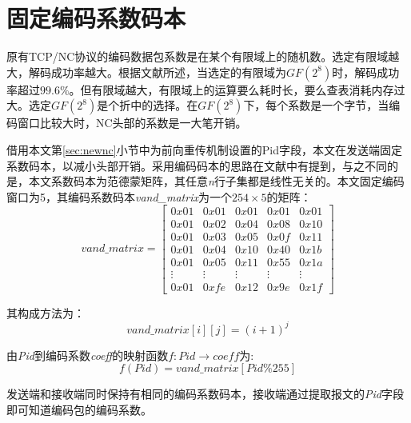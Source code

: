 \section{固定编码系数码本}
原有TCP/NC协议的编码数据包系数是在某个有限域上的随机数。选定有限域越大，解码成功率越大。根据文献\cite{4015738}所述，当选定的有限域为$GF\left(2^8\right)$时，解码成功率超过$99.6\%$。但有限域越大，有限域上的运算要么耗时长，要么查表消耗内存过大。选定$GF\left(2^8\right)$是个折中的选择。在$GF\left(2^8\right)$下，每个系数是一个字节，当编码窗口比较大时，NC头部的系数是一大笔开销。
\par
借用本文第\ref{sec:newnc}小节中为前向重传机制设置的Pid字段，本文在发送端固定系数码本，以减小头部开销。采用编码码本的思路在文献\cite{宋蒙2015基于网络编码的}中有提到，与之不同的是，本文系数码本为范德蒙矩阵，其任意\emph{n}行子集都是线性无关的。本文固定编码窗口为5，其编码系数码本\emph{vand\_matrix}为一个$254 \times 5$的矩阵：
\begin{equation}
	vand\_matrix=\left[ {\begin{array}{*{20}{c}}
		{0x01}&{0x01}&{0x01}&{0x01}&{0x01}\\
		{0x01}&{0x02}&{0x04}&{0x08}&{0x10}\\
		{0x01}&{0x03}&{0x05}&{0x0f}&{0x11}\\
		{0x01}&{0x04}&{0x10}&{0x40}&{0x1b}\\
		{0x01}&{0x05}&{0x11}&{0x55}&{0x1a}\\
		{\vdots}&{\vdots}&{\vdots}&{\vdots}&{\vdots}\\
		{0x01}&{0xfe}&{0x12}&{0x9e}&{0x1f}
		\end{array}} \right]
\end{equation}
\par
其构成方法为：
\begin{equation}
	vand\_matrix[i][j]=(i+1)^j
\end{equation}
\par
由\emph{Pid}到编码系数\emph{coeff}的映射函数$f:Pid \rightarrow coeff$为:
\begin{equation}
	f(Pid)=vand\_matrix[Pid\%255]
\end{equation}
\par
发送端和接收端同时保持有相同的编码系数码本，接收端通过提取报文的\emph{Pid}字段即可知道编码包的编码系数。
